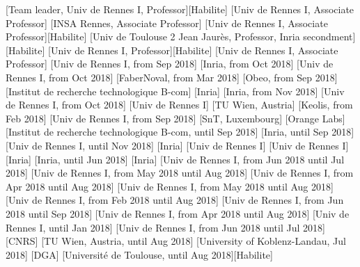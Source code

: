 \documentclass{ra2018}
\begin{document}
[Team leader, Univ de Rennes I, Professor][Habilite]
[Univ de Rennes I, Associate Professor]
[INSA Rennes, Associate Professor]
[Univ de Rennes I, Associate Professor][Habilite]
[Univ de Toulouse 2 Jean Jaurès, Professor, Inria secondment][Habilite]
[Univ de Rennes I, Professor][Habilite]
[Univ de Rennes I, Associate Professor]
[Univ de Rennes I, from Sep 2018]
[Inria, from Oct 2018]
[Univ de Rennes I, from Oct 2018]
[FaberNoval, from Mar 2018]
[Obeo, from Sep 2018]
[Institut de recherche technologique B-com]
[Inria]
[Inria, from Nov 2018]
[Univ de Rennes I, from Oct 2018]
[Univ de Rennes I]
[TU Wien, Austria]
[Keolis, from Feb 2018]
[Univ de Rennes I, from Sep 2018]
[SnT, Luxembourg]
[Orange Labs]
[Institut de recherche technologique B-com, until Sep 2018]
[Inria, until Sep 2018]
[Univ de Rennes I, until Nov 2018]
[Inria]
[Univ de Rennes I]
[Univ de Rennes I]
[Inria]
[Inria, until Jun 2018]
[Inria]
[Univ de Rennes I, from Jun 2018 until Jul 2018]
[Univ de Rennes I, from May 2018 until Aug 2018]
[Univ de Rennes I, from Apr 2018 until Aug 2018]
[Univ de Rennes I, from May 2018 until Aug 2018]
[Univ de Rennes I, from Feb 2018 until Aug 2018]
[Univ de Rennes I, from Jun 2018 until Sep 2018]
[Univ de Rennes I, from Apr 2018 until Aug 2018]
[Univ de Rennes I, until Jan 2018]
[Univ de Rennes I, from Jun 2018 until Jul 2018]
[CNRS]
[TU Wien, Austria, until Aug 2018]
[University of Koblenz-Landau, Jul 2018]
[DGA]
[Université de Toulouse, until Aug 2018][Habilite]
\end{document}
